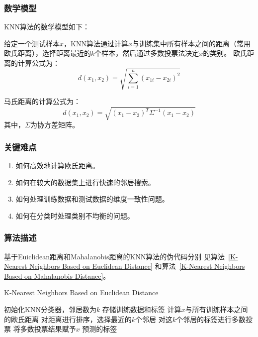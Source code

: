 \documentclass[12pt]{article}
\begin{document}
\subsubsection{数学模型}
KNN算法的数学模型如下：

给定一个测试样本$x$，KNN算法通过计算$x$与训练集中所有样本之间的距离（常用欧氏距离），选择距离最近的$k$个样本，然后通过多数投票法决定$x$的类别。
欧氏距离的计算公式为：
\[
  d(x_1, x_2) = \sqrt{\sum_{i=1}^{n} (x_{1i} - x_{2i})^2}
\]

马氏距离的计算公式为：
\[d(x_1, x_2) = \sqrt{(x_1 - x_2)^T \Sigma^{-1} (x_1 - x_2)}\]
其中，$\Sigma$为协方差矩阵。


\subsubsection{关键难点}
\begin{enumerate}
  \item 如何高效地计算欧氏距离。
  \item 如何在较大的数据集上进行快速的邻居搜索。
  \item 如何处理训练数据和测试数据的维度一致性问题。
  \item 如何在分类时处理类别不均衡的问题。
\end{enumerate}


\subsubsection{算法描述}
基于Euiclidean距离和Mahalanobis距离的KNN算法的伪代码分别
见算法~\ref{K-Nearest Neighbors Based on Euclidean Distance} 和算法~\ref{K-Nearest Neighbors Based on Mahalanobis Distance}。

\begin{algorithm}
  \caption{K-Nearest Neighbors Based on Euclidean Distance}
  \label{K-Nearest Neighbors Based on Euclidean Distance}
  \begin{algorithmic}[1]
    \State 初始化KNN分类器，邻居数为$k$
    \State 存储训练数据和标签
    \EndProcedure
    \State 计算$x$与所有训练样本之间的欧氏距离
    \State 对距离进行排序，选择最近的$k$个邻居
    \State 对这$k$个邻居的标签进行多数投票
    \State 将多数投票结果赋予$x$
    \EndFor
    \State \Return 预测的标签
    \EndProcedure
  \end{algorithmic}
\end{algorithm}
\end{document}
